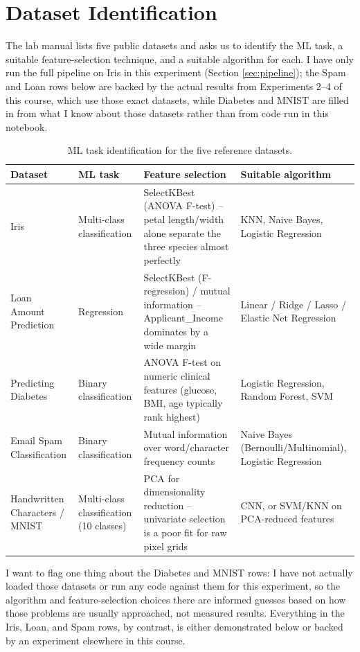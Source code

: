 \documentclass[11pt,a4paper]{article}
\begin{document}
\section{Dataset Identification}
The lab manual lists five public datasets and asks us to identify the ML task, a suitable feature-selection technique, and a suitable algorithm for each. I have only run the full pipeline on Iris in this experiment (Section \ref{sec:pipeline}); the Spam and Loan rows below are backed by the actual results from Experiments 2--4 of this course, which use those exact datasets, while Diabetes and MNIST are filled in from what I know about those datasets rather than from code run in this notebook.

\begin{table}[h]
\centering
\small
\begin{tabular}{@{}p{3.1cm}p{2.6cm}p{4.2cm}p{4cm}@{}}
\toprule
\textbf{Dataset} & \textbf{ML task} & \textbf{Feature selection} & \textbf{Suitable algorithm} \\
\midrule
Iris & Multi-class classification & SelectKBest (ANOVA F-test) -- petal length/width alone separate the three species almost perfectly & KNN, Naive Bayes, Logistic Regression \\
Loan Amount Prediction & Regression & SelectKBest (F-regression) / mutual information -- Applicant\_Income dominates by a wide margin & Linear / Ridge / Lasso / Elastic Net Regression \\
Predicting Diabetes & Binary classification & ANOVA F-test on numeric clinical features (glucose, BMI, age typically rank highest) & Logistic Regression, Random Forest, SVM \\
Email Spam Classification & Binary classification & Mutual information over word/character frequency counts & Naive Bayes (Bernoulli/Multinomial), Logistic Regression \\
Handwritten Characters / MNIST & Multi-class classification (10 classes) & PCA for dimensionality reduction -- univariate selection is a poor fit for raw pixel grids & CNN, or SVM/KNN on PCA-reduced features \\
\bottomrule
\end{tabular}
\caption{ML task identification for the five reference datasets.}
\end{table}

I want to flag one thing about the Diabetes and MNIST rows: I have not actually loaded those datasets or run any code against them for this experiment, so the algorithm and feature-selection choices there are informed guesses based on how those problems are usually approached, not measured results. Everything in the Iris, Loan, and Spam rows, by contrast, is either demonstrated below or backed by an experiment elsewhere in this course.
\end{document}
